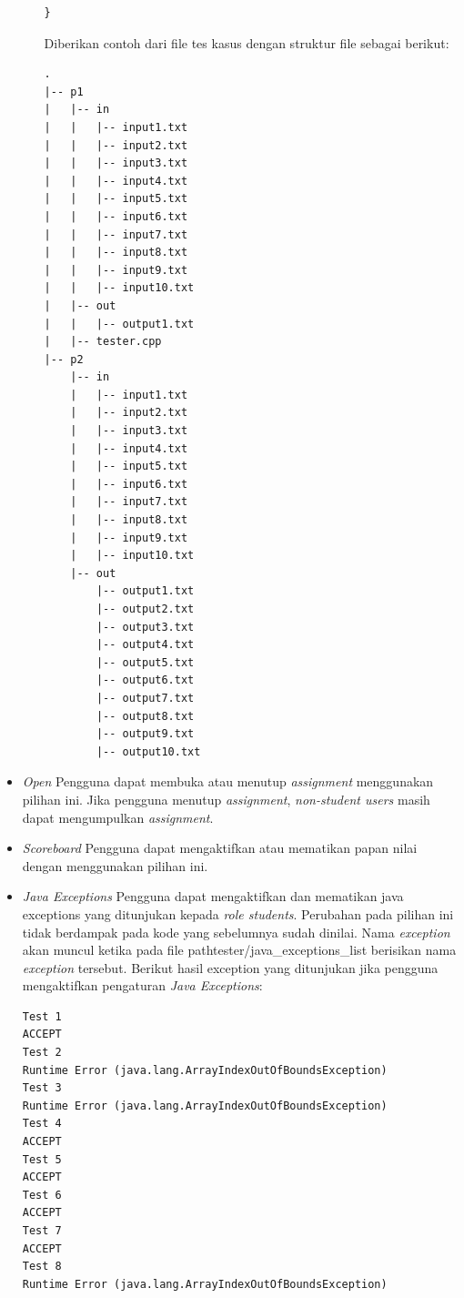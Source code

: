 \begin{itemize}
\begin{itemize}
\begin{verbatim}
}
        \end{verbatim}
        Diberikan contoh dari file tes kasus dengan struktur file sebagai berikut:
        \begin{verbatim}
.
|-- p1
|   |-- in
|   |   |-- input1.txt
|   |   |-- input2.txt
|   |   |-- input3.txt
|   |   |-- input4.txt
|   |   |-- input5.txt
|   |   |-- input6.txt
|   |   |-- input7.txt
|   |   |-- input8.txt
|   |   |-- input9.txt
|   |   |-- input10.txt
|   |-- out
|   |   |-- output1.txt
|   |-- tester.cpp
|-- p2
    |-- in
    |   |-- input1.txt
    |   |-- input2.txt
    |   |-- input3.txt
    |   |-- input4.txt
    |   |-- input5.txt
    |   |-- input6.txt
    |   |-- input7.txt
    |   |-- input8.txt
    |   |-- input9.txt
    |   |-- input10.txt
    |-- out
        |-- output1.txt
        |-- output2.txt
        |-- output3.txt
        |-- output4.txt
        |-- output5.txt
        |-- output6.txt
        |-- output7.txt
        |-- output8.txt
        |-- output9.txt
        |-- output10.txt   
        \end{verbatim}
    \end{itemize}
        \item \textit{Open} \newline
        Pengguna dapat membuka atau menutup \textit{assignment} menggunakan pilihan ini. Jika pengguna menutup \textit{assignment}, \textit{non-student users} masih dapat mengumpulkan \textit{assignment}. \\
        \item \textit{Scoreboard} \newline
        Pengguna dapat mengaktifkan atau mematikan papan nilai dengan menggunakan pilihan ini.
        \item \textit{Java Exceptions} \newline
        Pengguna dapat mengaktifkan dan mematikan java exceptions yang ditunjukan kepada \textit{role students}. Perubahan pada pilihan ini tidak berdampak pada kode yang sebelumnya sudah dinilai. Nama \textit{exception} akan muncul ketika pada file pathtester/java\_exceptions\_list berisikan nama \textit{exception} tersebut. Berikut hasil exception yang ditunjukan jika pengguna mengaktifkan pengaturan \textit{Java Exceptions}:
        \begin{verbatim}
Test 1
ACCEPT
Test 2
Runtime Error (java.lang.ArrayIndexOutOfBoundsException)
Test 3
Runtime Error (java.lang.ArrayIndexOutOfBoundsException)
Test 4
ACCEPT
Test 5
ACCEPT
Test 6
ACCEPT
Test 7
ACCEPT
Test 8
Runtime Error (java.lang.ArrayIndexOutOfBoundsException)

\end{verbatim}
\end{itemize}
